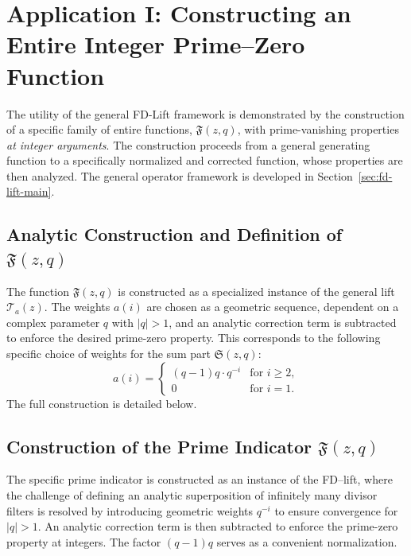 \section{Application I: Constructing an Entire Integer Prime--Zero Function}
\label{sec:application-prime-indicator}

The utility of the general FD-Lift framework is demonstrated by the construction of a specific family of entire functions, $\mathfrak{F}(z,q)$, with prime-vanishing properties \emph{at integer arguments}. The construction proceeds from a general generating function to a specifically normalized and corrected function, whose properties are then analyzed.
The general operator framework is developed in Section~\ref{sec:fd-lift-main}.

\subsection{Analytic Construction and Definition of $\mathfrak{F}(z,q)$}

The function $\mathfrak{F}(z,q)$ is constructed as a specialized instance of the general lift $\mathcal{T}_a(z)$. The weights $a(i)$ are chosen as a geometric sequence, dependent on a complex parameter $q$ with $|q|>1$, and an analytic correction term is subtracted to enforce the desired prime-zero property. This corresponds to the following specific choice of weights for the sum part $\mathfrak{S}(z,q)$:
\[
a(i) = 
\begin{cases} 
(q-1)q \cdot q^{-i} & \text{for } i \ge 2, \\
0 & \text{for } i=1.
\end{cases}
\]
The full construction is detailed below.

\subsection{Construction of the Prime Indicator $\mathfrak{F}(z,q)$}
\label{sec:prime-indicator-construction}

The specific prime indicator is constructed as an instance of the FD--lift, where the challenge of defining an analytic superposition of infinitely many divisor filters is resolved by introducing geometric weights $q^{-i}$ to ensure convergence for $|q|>1$. An analytic correction term is then subtracted to enforce the prime-zero property at integers. The factor $(q-1)q$ serves as a convenient normalization.

